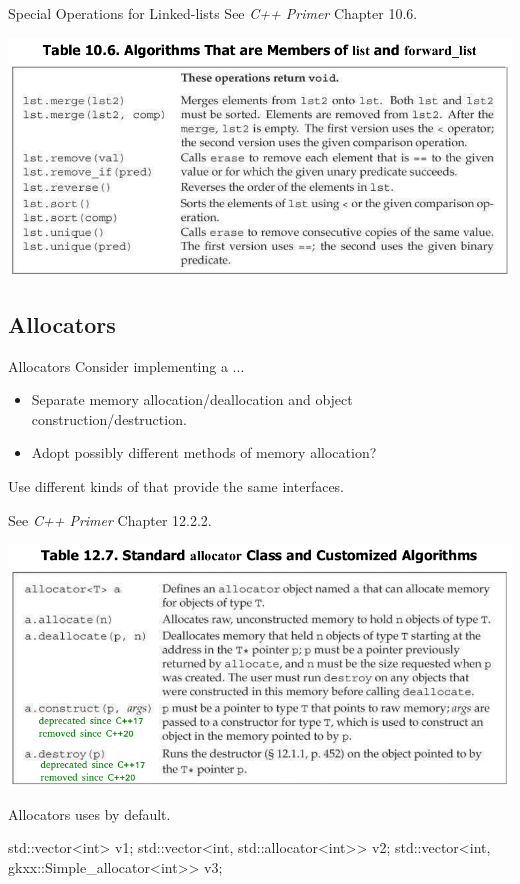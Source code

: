 \begin{frame}[fragile]{Special Operations for Linked-lists}
    See \textit{C++ Primer} Chapter 10.6.
    \begin{center}
        \includegraphics[width=\textwidth]{img/list_operations.png}
    \end{center}
\end{frame}

\subsection{Allocators}

\begin{frame}{Allocators}
    Consider implementing a ...
    \begin{itemize}
        \item Separate memory allocation/deallocation and object construction/destruction.
        \item Adopt possibly different methods of memory allocation?
    \end{itemize}
    \pause
    Use different kinds of  that provide the same interfaces.
\end{frame}

\begin{frame}[fragile]{}
    See \textit{C++ Primer} Chapter 12.2.2.
    \begin{center}
        \includegraphics[width=\textwidth]{img/allocator_operations.png}
    \end{center}
\end{frame}

\begin{frame}[fragile]{Allocators}
     uses  by default.
    \begin{cpp}
std::vector<int> v1;
std::vector<int, std::allocator<int>> v2;
std::vector<int, gkxx::Simple_allocator<int>> v3;
    \end{cpp}
\end{frame}